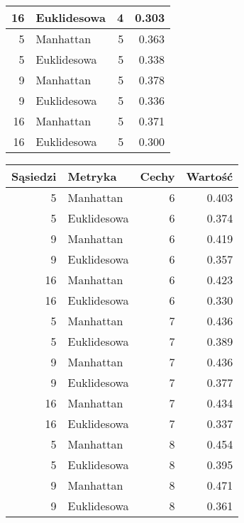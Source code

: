 \documentclass[runningheads]{llncs}
\begin{document}
\begin{table}[H]
\begin{minipage}{0.5\textwidth}
\begin{tabular}{|r|l|r|r|}
    \hline
    16 & Euklidesowa & 4 & 0.303 \bigstrut\\
    \hline
    5 & Manhattan & 5 & 0.363 \bigstrut\\
    \hline
    5 & Euklidesowa & 5 & 0.338 \bigstrut\\
    \hline
    9 & Manhattan & 5 & 0.378 \bigstrut\\
    \hline
    9 & Euklidesowa & 5 & 0.336 \bigstrut\\
    \hline
    16 & Manhattan & 5 & 0.371 \bigstrut\\
    \hline
    16 & Euklidesowa & 5 & 0.300 \bigstrut\\
    \hline
    \end{tabular}
    \end{minipage}
    \begin{minipage}{0.5\textwidth}
    \begin{tabular}{|r|l|r|r|}
    \hline
    \multicolumn{1}{|l|}{\textbf{Sąsiedzi}} & \textbf{Metryka} & \multicolumn{1}{l|}{\textbf{Cechy}} & \multicolumn{1}{l|}{\textbf{Wartość}} \bigstrut\\
    \hline
    5 & Manhattan & 6 & 0.403 \bigstrut\\
    \hline
    5 & Euklidesowa & 6 & 0.374 \bigstrut\\
    \hline
    9 & Manhattan & 6 & 0.419 \bigstrut\\
    \hline
    9 & Euklidesowa & 6 & 0.357 \bigstrut\\
    \hline
    16 & Manhattan & 6 & 0.423 \bigstrut\\
    \hline
    16 & Euklidesowa & 6 & 0.330 \bigstrut\\
    \hline
    5 & Manhattan & 7 & 0.436 \bigstrut\\
    \hline
    5 & Euklidesowa & 7 & 0.389 \bigstrut\\
    \hline
    9 & Manhattan & 7 & 0.436 \bigstrut\\
    \hline
    9 & Euklidesowa & 7 & 0.377 \bigstrut\\
    \hline
    16 & Manhattan & 7 & 0.434 \bigstrut\\
    \hline
    16 & Euklidesowa & 7 & 0.337 \bigstrut\\
    \hline
    5 & Manhattan & 8 & 0.454 \bigstrut\\
    \hline
    5 & Euklidesowa & 8 & 0.395 \bigstrut\\
    \hline
    9 & Manhattan & 8 & 0.471 \bigstrut\\
    \hline
    9 & Euklidesowa & 8 & 0.361 \bigstrut\\

\end{tabular}
\end{minipage}
\end{table}
\end{document}
